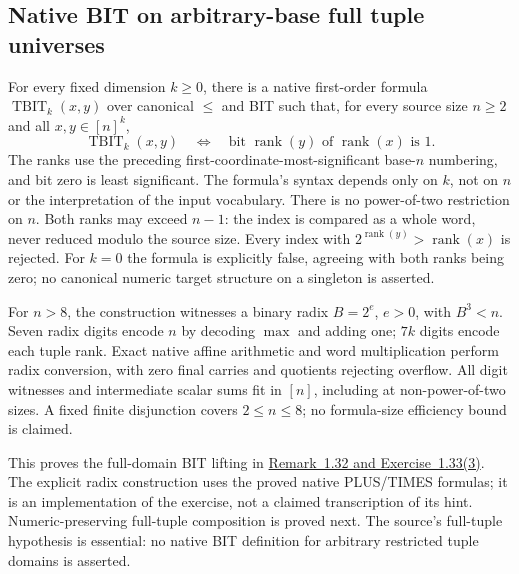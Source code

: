 \begin{result}
\subsection{Native BIT on arbitrary-base full tuple universes}
For every fixed dimension $k\ge0$, there is a native first-order formula
$\operatorname{TBIT}_k(x,y)$ over canonical $\le$ and BIT such that, for every
source size $n\ge2$ and all $x,y\in[n]^k$,
\[
\operatorname{TBIT}_k(x,y)\quad\Longleftrightarrow\quad
\text{bit }\operatorname{rank}(y)\text{ of }\operatorname{rank}(x)\text{ is }1.
\]
The ranks use the preceding first-coordinate-most-significant base-$n$
numbering, and bit zero is least significant. The formula's syntax depends only
on $k$, not on $n$ or the interpretation of the input vocabulary. There is no
power-of-two restriction on $n$. Both ranks may exceed $n-1$: the index is
compared as a whole word, never reduced modulo the source size. Every index
with $2^{\operatorname{rank}(y)}>\operatorname{rank}(x)$ is rejected.
For $k=0$ the formula is explicitly false, agreeing with both ranks being zero;
no canonical numeric target structure on a singleton is asserted.

For $n>8$, the construction witnesses a binary radix $B=2^e$, $e>0$, with
$B^3<n$. Seven radix digits encode $n$ by decoding $\max$ and adding one;
$7k$ digits encode each tuple rank. Exact native affine arithmetic and word
multiplication perform radix conversion, with zero final carries and quotients
rejecting overflow. All digit witnesses and intermediate scalar sums fit in
$[n]$, including at non-power-of-two sizes. A fixed finite disjunction covers
$2\le n\le8$; no formula-size efficiency bound is claimed.

This proves the full-domain BIT lifting in
\href{https://people.cs.umass.edu/~immerman/book/ch0_1_2.pdf\#page=37}{Remark~1.32
and Exercise~1.33(3)}.\citep{Immerman1999}
The explicit radix construction uses the proved native PLUS/TIMES formulas;
it is an implementation of the exercise, not a claimed transcription of its
hint. Numeric-preserving full-tuple composition is proved next. The source's
full-tuple hypothesis is essential: no native BIT definition for arbitrary
restricted tuple domains is asserted.
\end{result}

